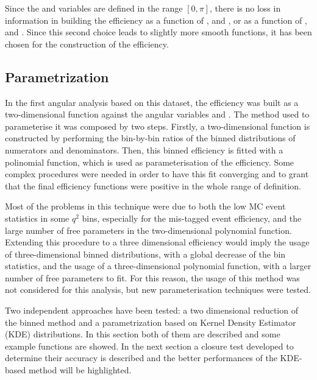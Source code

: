 
Since the \TK and \TK variables are defined in the range $[0,\pi]$, there is no loss in information in building the efficiency as a function of \TK, \TL and \PHI, or as a function of \cTK, \cTL and \PHI. Since this second choice leads to slightly more smooth functions, it has been chosen for the construction of the efficiency. 

\subsection{Parametrization}\label{sec:eff_param}

In the first angular analysis based on this dataset, the efficiency was built as a two-dimensional function against the angular variables \TK and \TL.
The method used to parameterise it was composed by two steps.
Firstly, a two-dimensional function is constructed by performing the bin-by-bin ratios of the binned distributions of numerators and denominators.
Then, this binned efficiency is fitted with a polinomial function, which is used as parameterisation of the efficiency.
Some complex procedures were needed in order to have this fit converging and to grant that the final efficiency functions were positive in the whole range of definition.

Most of the problems in this technique were due to both the low MC event statistics in some $q^2$ bins, especially for the mis-tagged event efficiency, and the large number of free parameters in the two-dimensional polynomial function.
Extending this procedure to a three dimensional efficiency would imply the usage of three-dimensional binned distributions, with a global decrease of the bin statistics, and the usage of a three-dimensional polynomial function, with a larger number of free parameters to fit.
For this reason, the usage of this method was not considered for this analysis, but new parameterisation techniques were tested.

Two independent approaches have been tested: a two dimensional reduction of the binned method and a parametrization based on Kernel Density Estimator (KDE) distributions.
In this section both of them are described and some example functions are showed.
In the next section a closure test developed to determine their accuracy is described and the better performances of the KDE-based method will be highlighted.

